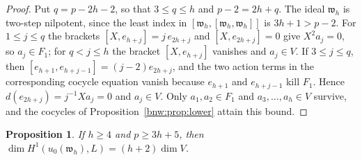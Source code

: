 \documentclass[11pt,reqno]{amsart}
\newtheorem{proposition}[proposition]{Proposition}
\theoremstyle{definition}
\theoremstyle{remark}
\theoremstyle{definition}
\begin{document}
\begin{proof}
Put $q=p-2h-2$, so that $3\le q\le h$ and $p-2=2h+q$. The ideal $\mathfrak{w}_h$ is two-step nilpotent, since the least index in
$[\mathfrak{w}_h,[\mathfrak{w}_h,\mathfrak{w}_h]]$ is $3h+1>p-2$. For $1\le j\le q$ the
brackets $[X,e_{h+j}]=j\,e_{2h+j}$ and $[X,e_{2h+j}]=0$ give
$X^2a_j=0$, so $a_j\in F_1$; for $q<j\le h$ the bracket
$[X,e_{h+j}]$ vanishes and $a_j\in V$. If $3\le j\le q$, then
$[e_{h+1},e_{h+j-1}]=(j-2)e_{2h+j}$, and the two action terms in the
corresponding cocycle equation vanish because $e_{h+1}$ and
$e_{h+j-1}$ kill $F_1$. Hence $d(e_{2h+j})=j^{-1}Xa_j=0$ and
$a_j\in V$. Only $a_1,a_2\in F_1$ and $a_3,\ldots,a_h\in V$ survive, and the
cocycles of Proposition~\ref{bnw:prop:lower} attain this bound.
\end{proof}

\begin{proposition}\label{bnw:prop:deep}
If $h\ge4$ and $p\ge3h+5$, then
$\dim H^1(u_0(\mathfrak{w}_h),L)=(h+2)\dim V$.
\end{proposition}
\end{document}
